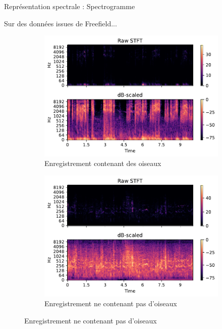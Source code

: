 \documentclass[compress,xcolor=table]{beamer}
\begin{document}
\begin{frame}{Représentation spectrale : Spectrogramme}

    Sur des données issues de Freefield...

    \begin{figure}[ht]
        \centering
        \begin{subfigure}[b]{0.45\textwidth}
            \centering
            \includegraphics[width=\textwidth]{../images/audio/birds.spectrogram.ff1010.pdf}
            \caption{Enregistrement contenant des oiseaux}
            \label{fig:birds.spectrogram.ff1010}
        \end{subfigure}
        \hfill
        \begin{subfigure}[b]{0.45\textwidth}
            \centering
            \includegraphics[width=\textwidth]{../images/audio/nobirds.spectrogram.ff1010.pdf}
            \caption{Enregistrement ne contenant pas d'oiseaux}
            \label{fig:nobirds.spectrogram.ff1010}
        \end{subfigure}
    \end{figure}

\end{frame}
\end{document}
